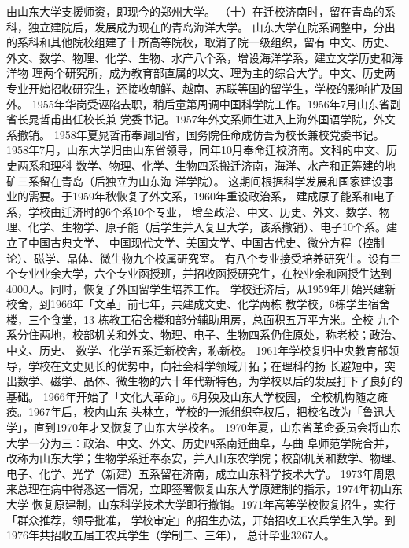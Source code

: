 \documentclass[openany]{sduthesis} %
\begin{document}
 由山东大学支援师资，即现今的郑州大学。 （十）在迁校济南时，留在青岛的系科，独立建院后，发展成为现在的青岛海洋大学。 山东大学在院系调整中，分出的系科和其他院校组建了十所高等院校，取消了院一级组织，留有 中文、历史、外文、数学、物理、化学、生物、水产八个系，增设海洋学系，建立文学历史和海洋物 理两个研究所，成为教育部直属的以文、理为主的综合大学。中文、历史两专业开始招收研究生，还接收朝鲜、越南、苏联等国的留学生，学校的影响扩及国外。 1955年华岗受诬陷去职，稍后童第周调中国科学院工作。1956年7月山东省副省长晁哲甫出任校长兼 党委书记。1957年外文系师生进入上海外国语学院，外文系撤销。 1958年夏晁哲甫奉调回省，国务院任命成仿吾为校长兼校党委书记。 1958年7月，山东大学归由山东省领导，同年10月奉命迁校济南。文科的中文、历史两系和理科 数学、物理、化学、生物四系搬迁济南，海洋、水产和正筹建的地矿三系留在青岛（后独立为山东海 洋学院）。 这期间根据科学发展和国家建设事业的需要。于1959年秋恢复了外文系，1960年重设政治系， 建成原子能系和电子系，学校由迁济时的6个系10个专业， 增至政治、中文、历史、外文、数学、物 理、化学、生物学、原子能（后学生并入复旦大学，该系撤销）、电子10个系。建立了中国古典文学、 中国现代文学、美国文学、中国古代史、微分方程（控制论）、磁学、晶体、微生物九个校属研究室。 有八个专业接受培养研究生。设有三个专业业余大学，六个专业函授班，并招收函授研究生，在校业余和函授生达到4000人。同时，恢复了外国留学生培养工作。 学校迁济后，从1959年开始兴建新校舍，到1966年「文革」前七年，共建成文史、化学两栋 教学校，6栋学生宿舍楼，三个食堂，13 栋教工宿舍楼和部分辅助用房，总面积五万平方米。全校 九个系分住两地，校部机关和外文、物理、电子、生物四系仍住原处，称老校；政治、中文、历史、 数学、化学五系迁新校舍，称新校。 1961年学校复归中央教育部领导，学校在文史见长的优势中，向社会科学领域开拓；在理科的扬 长避短中，突出数学、磁学、晶体、微生物的六十年代新特色，为学校以后的发展打下了良好的基础。 1966年开始了「文化大革命」。6月殃及山东大学校园， 全校机构随之瘫痪。1967年后，校内山东 头林立，学校的一派组织夺权后，把校名改为「鲁迅大学」，直到1970年才又恢复了山东大学校名。 1970年夏，山东省革命委员会将山东大学一分为三：政治、中文、外文、历史四系南迁曲阜，与曲 阜师范学院合并，改称为山东大学；生物学系迁奉泰安，并入山东农学院；校部机关和数学、物理、 电子、化学、光学（新建）五系留在济南，成立山东科学技术大学。 1973年周恩来总理在病中得悉这一情况，立即签署恢复山东大学原建制的指示，1974年初山东大学 恢复原建制，山东科学技术大学即行撤销。1971年高等学校恢复招生，实行「群众推荐，领导批准， 学校审定」的招生办法，开始招收工农兵学生入学。到1976年共招收五届工农兵学生（学制二、三年）， 总计毕业3267人。
\end{document}
